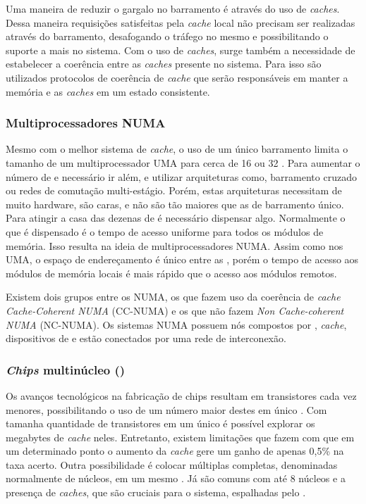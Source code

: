 Uma maneira de reduzir o gargalo no barramento é através do uso de \textit{caches}. Dessa maneira requisições satisfeitas pela \textit{cache} local não precisam ser realizadas através do barramento, desafogando o tráfego no mesmo e possibilitando o suporte a mais \cpus no sistema. Com o uso de \textit{caches}, surge também a necessidade de estabelecer a coerência entre as \textit{caches} presente no sistema. Para isso são utilizados protocolos de coerência de \textit{cache} que serão responsáveis em manter a memória e as \textit{caches} em um estado consistente.

\subsubsection{Multiprocessadores NUMA}
\label{subsubsec:hw-multiprocessadores-numa}

Mesmo com o melhor sistema de \textit{cache}, o uso de um único barramento limita o tamanho de um multiprocessador UMA para cerca de 16 ou 32 \cpus \cite{Tanenbaum:2014:MOS:2655363}. Para aumentar o número de \cpus e necessário ir além, e utilizar arquiteturas como, barramento cruzado ou redes de comutação multi-estágio. Porém, estas arquiteturas necessitam de muito hardware, são caras, e não são tão maiores que as de barramento único. Para atingir a casa das dezenas de \cpus é necessário dispensar algo. Normalmente o que é dispensado é o tempo de acesso uniforme para todos os módulos de memória. Isso resulta na ideia de multiprocessadores NUMA. Assim como nos UMA, o espaço de endereçamento é único entre as \cpus, porém o tempo de acesso aos módulos de memória locais é mais rápido que o acesso aos módulos remotos.

Existem dois grupos entre os NUMA, os que fazem uso da coerência de \textit{cache} \textit{Cache-Coherent NUMA} (CC-NUMA) e os que não fazem \textit{Non Cache-coherent NUMA} (NC-NUMA). Os sistemas NUMA possuem nós compostos por \cpu, \textit{cache}, dispositivos de \io e estão conectados por uma rede de interconexão.

\subsubsection{\textit{Chips} multinúcleo (\multicore)}
\label{subsubsec:chips-multinucleo}

Os avanços tecnológicos na fabricação de chips resultam em transistores cada vez menores, possibilitando o uso de um número maior destes em único \chip. Com tamanha quantidade de transistores em um único \chip é possível explorar os megabytes de \textit{cache} neles. Entretanto, existem limitações que fazem com que em um determinado ponto o aumento da \textit{cache} gere um ganho de apenas 0,5\% na taxa acerto. Outra possibilidade é colocar múltiplas \cpus completas, denominadas normalmente de núcleos, em um mesmo \chip. Já são comuns \chips com até 8 núcleos e a presença de \textit{caches}, que são cruciais para o sistema, espalhadas pelo \chip.

